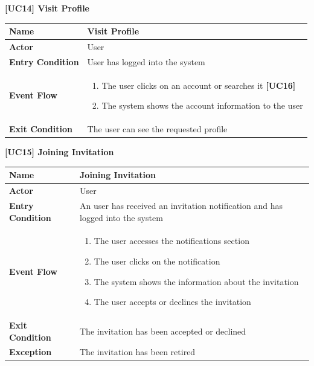 \documentclass{article}
\begin{document}
\begin{table}
 \renewcommand{\arraystretch}{1.5}
    \centering
    \raggedright\textbf{[UC14] Visit Profile}
    \begin{tabular}{|l|p{10cm}|}
        \hline
        \textbf{Name} & Visit Profile \\
        \hline
        \textbf{Actor} & User \\
        \hline
        \textbf{Entry Condition} & User has logged into the system\\
        \hline
        \textbf{Event Flow} & 
        \begin{enumerate}[align=left, topsep=0pt, partopsep=0pt]
            \item The user clicks on an account or searches it \textbf{[UC16]}
            \item The system shows the account information to the user
        \end{enumerate} \\
        \hline
        \textbf{Exit Condition} & The user can see the requested profile \\
        \hline
    \end{tabular}
\end{table}

\begin{table}
 \renewcommand{\arraystretch}{1.5}
    \centering
    \raggedright\textbf{[UC15] Joining Invitation}
    \begin{tabular}{|l|p{10cm}|}
        \hline
        \textbf{Name} & Joining Invitation \\
        \hline
        \textbf{Actor} & User \\
        \hline
        \textbf{Entry Condition} & An user has received an invitation notification and has logged into the system\\
        \hline
        \textbf{Event Flow} & 
        \begin{enumerate}[align=left, topsep=0pt, partopsep=0pt]
            \item The user accesses the notifications section
            \item The user clicks on the notification
            \item The system shows the information about the invitation
            \item The user accepts or declines the invitation
        \end{enumerate} \\
        \hline
        \textbf{Exit Condition} & The invitation has been accepted or declined \\
        \hline
        \textbf{Exception} & The invitation has been retired \\
        \hline
    \end{tabular}
\end{table}
\end{document}
